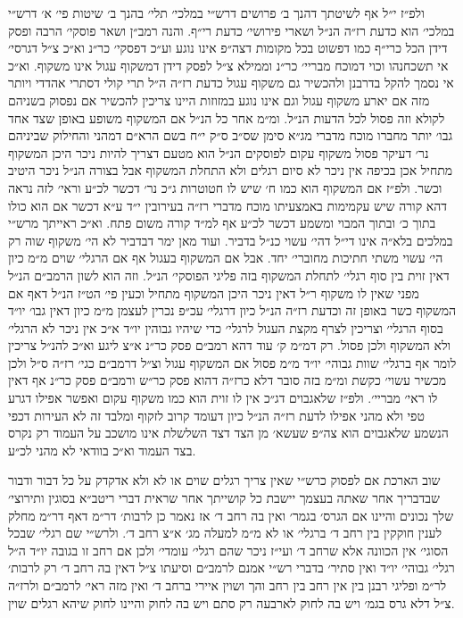 \documentclass[12pt, openany]{book}
\begin{document}
\begin{multicols}{2}
ולפ״ז י״ל אף לשיטתך דהנך ב׳ פרושים דרש״י במלכי׳ תלי׳ בהנך ב׳ שיטות פי׳ א׳ דרש״י במלכי׳ הוא כדעת רז״ה הנ״ל ושארי פירושי׳ כדעת רי״ף. והנה רמב״ן ושאר פוסקי׳ הרבה ופסק דידן הכל כרי״ף כמו דפשוט בכל מקומות דצה״פ אינו נוגע וע״כ דפסקי׳ כר״נ וא״כ צ״ל דגרסי׳ אי תשכחנהו וכוי דמוכח מבריי׳ כר״נ וממילא צ״ל לפסק דידן דמשקוף עגול אינו משקוף. וא״כ אי נסמך להקל בדרבנן ולהכשיר גם משקוף עגול כדעת רז״ה ה״ל תרי קולי דסתרי אהדדי ויותר מזה אם יארע משקוף עגול וגם אינו נוגע במזוזות היינו צריכין להכשיר אם נפסוק בשניהם לקולא וזה פסול לכל הדעות הנ״ל. ומ״מ אחר כל הנ״ל אם המשקוף משופע באופן שצד אחד גבו׳ יותר מחברו מוכח מדברי מג״א סימן שס״ב ס״ק י״ח בשם הרא״ם דמהני והחילוק שביניהם נר׳ דעיקר פסול משקוף עקום לפוסקים הנ״ל הוא מטעם דצריך להיות ניכר היכן המשקוף מתחיל אכן בכיפה אין ניכר לא סיום רגלים ולא התחלת המשקוף אבל בצורה הנ״ל ניכר היטיב וכשר. ולפ״ז אם המשקוף הוא כמו ח׳ שיש לו חטוטרות ג״כ נר׳ דכשר לכ״ע וראי׳ לזה נראה דהא קורה שיש עקמימות באמצעיתו מוכח מדברי רז״ה בעירובין י״ד ע״א דכשר אם הוא כולו בתוך כ׳ ובתוך המבוי ומשמע דכשר לכ״ע אף למ״ד קורה משום פתח. וא״כ ראייתך מרש״י במלכים בלא״ה אינו די״ל דהי׳ עשוי כנ״ל בדביר. ועוד מאן ימר דבדביר לא הי׳ משקוף שוה רק הי׳ עשוי משתי חתיכות מחוברי׳ יחד. אבל אם המשקוף בעגול אף אם הרגלי׳ שוים מ״מ כיון דאין זוית בין סוף רגלי׳ לתחלת המשקוף בזה פליגי הפוסקי׳ הנ״ל. וזה הוא לשון הרמב״ם הנ״ל מפני שאין לו משקוף ר״ל דאין ניכר היכן המשקוף מתחיל וכעין פי׳ הט״ז הנ״ל דאף אם המשקוף כשר באופן זה וכדעת רז״ה הנ״ל כיון דרגלי׳ עכ״פ נכרין לעצמן מ״מ כיון דאין גבו׳ יו״ד בסוף הרגלי׳ וצריכין לצרף מקצת העגול לרגלי׳ כדי שיהיו גבוהין יו״ד א״כ אין ניכר לא הרגלי׳ ולא המשקוף ולכן פסול. רק דמ״מ ק׳ עוד דהא רמב״ם פסק כר״נ א״צ ליגע וא״כ להנ״ל צריכין לומר אף ברגלי׳ שוות גבוהי׳ יו״ד מ״מ פסול אם המשקוף עגול וצ״ל דרמב״ם כגי׳ רז״ה ס״ל ולכן מכשיר עשוי׳ כקשת ומ״מ בזה סובר דלא כרז״ה דהוא פסק כר״ש ורמב״ם פסק כר״נ אף דאין לו ראי׳ מבריי׳. ולפ״ז שלאגבוים דג״כ אין לו זוית הוא כמו משקוף עקום ואפשר אפילו דגרע טפי ולא מהני אפילו לדעת רז״ה הנ״ל כיון דעומד קרוב לזקוף ומלבד זה לא העירות דכפי הנשמע שלאגבוים הוא צה״פ שעשא׳ מן הצד דצד השלשלת אינו מושכב על העמוד רק נקרס בצד העמוד וא״כ בוודאי לא מהני לכ״ע.\\\vspace{0pt}

שוב הארכת אם לפסוק כרש״י שאין צריך רגלים שוים או לא ולא אדקדק על כל דבור ודבור שבדבריך אחר שאתה בעצמך יישבת כל קושייתך אחר שראית דברי ריטב״א בסוגין ותירוצי׳ שלך נכונים והיינו אם הגרס׳ בגמר׳ ואין בה רחב ד׳ אז נאמר כן לרבות׳ דר״מ דאף דר״מ מחלק לענין חוקקין בין רחב ד׳ ברגלי׳ או לא מ״מ למעלה מג׳ א״צ רחב ד׳. ולרש״י שם רגלי׳ שבכל הסוגי׳ אין הכוונה אלא שרחב ד׳ ועי״ז ניכר שהם רגלי׳ עומדי׳ ולכן אם רחב זו בגובה יו״ד ה״ל רגלי׳ גבוהי׳ יו״ד ואין סתיר׳ בדברי רש״י אמנם לרמב״ם וסיעתו צ״ל דאין בה רחב ד׳ רק לרבות׳ לר״מ ופליגי רבנן בין אין רחב בין רחב והך ושוין איירי ברחב ד׳ ואין מזה ראי׳ לרמב״ם ולרז״ה צ״ל דלא גרס בגמ׳ ויש בה לחוק לארבעה רק סתם ויש בה לחוק והיינו לחוק שיהא רגלים שוין.\\\vspace{0pt}


\end{multicols}
\end{document}
